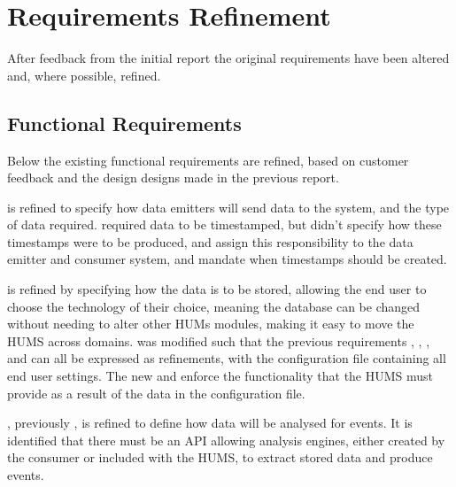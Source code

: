 \section{Requirements Refinement}
\label{sec:requirements}
After feedback from the initial report the original requirements have been 
altered and, where possible, refined.

\subsection{Functional Requirements}
\label{sec:requirements-functional}
Below the existing functional requirements are refined, based on customer 
feedback and the design designs made in the previous report.

 is refined to specify how data emitters will send data to the system, 
and the type of data required. 
 required data to be timestamped, but didn't specify how these 
timestamps were to be produced,  and  assign this
responsibility to the data emitter and consumer system, and mandate when 
timestamps should be created.

 is refined by specifying how the data is to be stored, allowing the end 
user to choose the technology of their choice, meaning the database can be 
changed without needing to alter other HUMs modules, making it easy to 
move the HUMS across domains.
 was modified such that the previous requirements , , 
, and  can all be expressed as refinements, with the 
configuration file containing all end user settings. The new  and  
enforce the  functionality that the HUMS must provide as a result of the data 
in the configuration file.

, previously , is refined to define how data will be analysed for 
events. It is identified that there must be an API allowing analysis engines, 
either created by the consumer or included with the HUMS, to extract stored 
data and produce events. 


